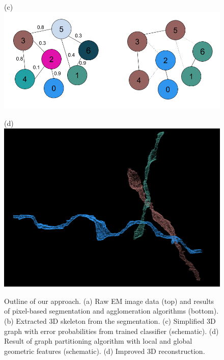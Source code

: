 \documentclass[10pt,twocolumn,letterpaper]{article}
\begin{document}
\begin{figure}[t]
\begin{minipage}{\textwidth}
\begin{minipage}{0.2\textwidth}
		\end{minipage}
		\begin{minipage}{0.3\textwidth}
			(c)\includegraphics[width=\linewidth]{figures/schema/multicut-graph.png}
		\end{minipage}
		\begin{minipage}{0.2\textwidth}
			(d)\includegraphics[width=\linewidth]{figures/schema/post-multicut.png}
		\end{minipage}
		\caption{Outline of our approach. (a) Raw EM image data (top) and results of pixel-based segmentation and agglomeration algorithms (bottom). (b) Extracted 3D skeleton from the segmentation. (c) Simplified 3D graph with error probabilities from trained classifier (schematic). (d) Result of graph partitioning algorithm with local and global geometric features (schematic). (d) Improved 3D reconstruction.}
		\label{fig:teaser}
	\end{minipage}
\end{figure}
\end{document}
